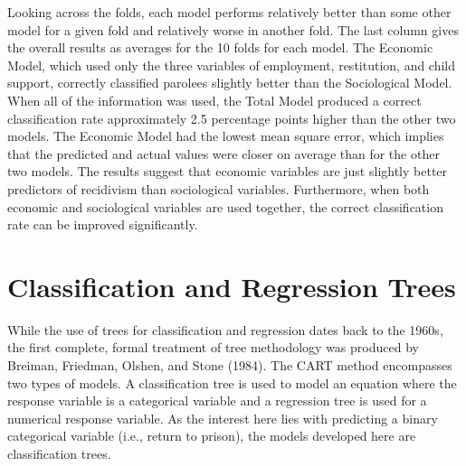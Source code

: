 Looking across the folds, each model performs relatively better than some other model for a given fold and relatively worse in another fold.  The last column gives the overall results as averages for the 10 folds for each model.  The Economic Model, which used only the three variables of employment, restitution, and child support, correctly classified parolees slightly better than the Sociological Model.  When all of the information was used, the Total Model produced a correct classification rate approximately 2.5 percentage points higher than the other two models.  The Economic Model had the lowest mean square error, which implies that the predicted and actual values were closer on average than for the other two models.  The results suggest that economic variables are just slightly better predictors of recidivism than sociological variables.  Furthermore, when both economic and sociological variables are used together, the correct classification rate can be improved significantly.

\section{Classification and Regression Trees}

While the use of trees for classification and regression dates back to the 1960s, the first complete, formal treatment of tree methodology was produced by Breiman, Friedman, Olshen, and Stone (1984).  The CART method encompasses two types of models.  A classification tree is used to model an equation where the response variable is a categorical variable and a regression tree is used for a numerical response variable.  As the interest here lies with predicting a binary categorical variable (i.e., return to prison), the models developed here are classification trees.

